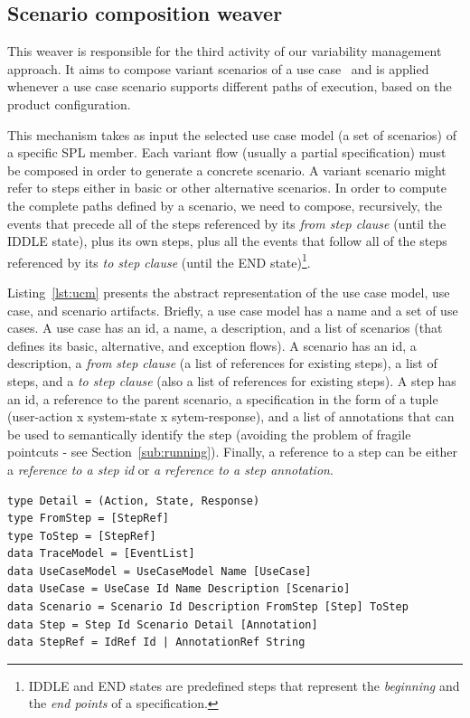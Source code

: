 \documentclass{acm_proc_article-sp}
\begin{document}

\subsection{Scenario composition weaver}\label{sub:sc-weaver}

This weaver is responsible for the third activity of our variability management 
approach. It aims to compose variant scenarios of a use case~\cite{gcabral-sbmf-2006} and 
is applied whenever a use case scenario supports different paths of execution, based on the product configuration.

This mechanism takes as
input the selected use case model (a set of scenarios) of a specific SPL member.
Each variant flow (usually a partial specification) must be composed 
in order to generate a concrete scenario. A variant scenario 
might refer to steps either in basic or other alternative scenarios. In order
to compute the complete paths defined by a scenario, we need to compose,
recursively, the events that precede all of the steps referenced by its \emph{from step
clause} (until the IDDLE state), plus its own steps, plus all the
events that follow all of the steps referenced by its \emph{to step clause} (until the END
state)\footnote{IDDLE and END states are predefined steps that
represent the \emph{beginning} and the \emph{end points} of a
specification.}. 

Listing~\ref{lst:ucm} presents the abstract representation of the
use case model, use case, and scenario artifacts. Briefly, a use
case model has a name and a set of use cases. A use case has an id,
a name, a description, and a list of scenarios (that defines its
basic, alternative, and exception flows). A scenario has an id, a
description, a \emph{from step clause} (a list of references for
existing steps), a list of steps, and a \emph{to step clause} (also
a list of references for existing steps). A step has an id, a
reference to the parent scenario, a specification in the form of a tuple
(user-action x system-state x sytem-response), and a list of annotations
that can be used to semantically identify the step (avoiding
the problem of fragile pointcuts - see Section~\ref{sub:running}).
Finally, a reference to a step can be either a \emph{reference to a
step id} or \emph{a reference to a step annotation}.

\begin{lstlisting}[belowskip=10pt,frame=tb,caption={Use Case and Scenario representation},label=lst:ucm]
type Detail = (Action, State, Response)
type FromStep = [StepRef]
type ToStep = [StepRef]
data TraceModel = [EventList]
data UseCaseModel = UseCaseModel Name [UseCase]
data UseCase = UseCase Id Name Description [Scenario]
data Scenario = Scenario Id Description FromStep [Step] ToStep
data Step = Step Id Scenario Detail [Annotation]
data StepRef = IdRef Id | AnnotationRef String
\end{lstlisting}
\end{document}
